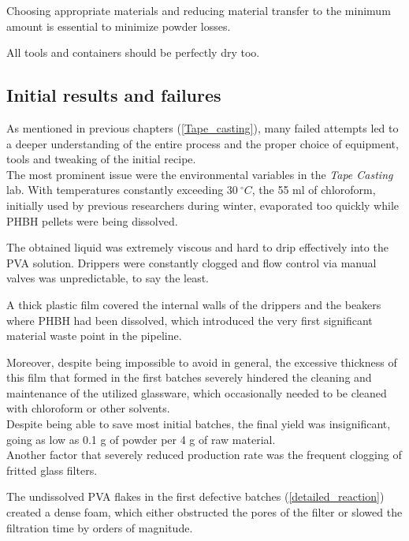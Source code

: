 \documentclass{article}
\begin{document}
        Choosing appropriate materials and reducing material transfer to the minimum amount is essential to minimize 
        powder losses. 

        All tools and containers should be perfectly dry too. 



        \subsection{Initial results and failures\label{initial_failures}}

        As mentioned in previous chapters (\ref{Tape_casting}), many failed attempts led to a deeper understanding of the entire process 
        and the proper choice of equipment, tools and tweaking of the initial recipe. \\ 

        The most prominent issue were the environmental variables in the \textit{Tape Casting} lab. With temperatures constantly exceeding 
        $30 \ ^{\circ}C$, the 55 ml of chloroform, initially used by previous researchers during winter, evaporated too 
        quickly while PHBH pellets were being dissolved. 

        The obtained liquid was extremely viscous and hard to drip effectively into the PVA solution. Drippers were constantly clogged
        and flow control via manual valves was unpredictable, to say the least. 
        
        A thick plastic film covered the internal walls of the drippers and the beakers where PHBH had been dissolved, which 
        introduced the very first significant material waste point in the pipeline. 

        Moreover, despite being impossible to avoid in general, the excessive thickness of this film that formed in the first batches 
        severely hindered the cleaning and maintenance of the utilized glassware, which occasionally needed to be cleaned with chloroform 
        or other solvents. \\ 

        Despite being able to save most initial batches, the final yield was insignificant, going as low as 0.1 g of powder 
        per 4 g of raw material. \\ 
        
        Another factor that severely reduced production rate was the frequent clogging of fritted glass filters. 
        
        The undissolved PVA flakes in the first defective batches (\ref{detailed_reaction}) created a dense foam, which either obstructed 
        the pores of the filter or slowed the filtration time by orders of magnitude. 
\end{document}
